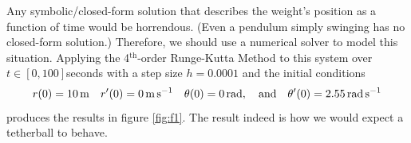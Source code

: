\documentclass{article}
\newcommand{\0}{\vb{0}}
\begin{document}
Any symbolic/closed-form solution that describes the weight's position as a function of time would be horrendous. (Even a pendulum simply swinging has no closed-form solution.) Therefore, we should use a numerical solver to model this situation. Applying the 4$^\mathrm{th}$-order Runge-Kutta Method to this system over $t \in [0, 100]$seconds with a step size $h = 0.0001$ and the initial conditions 
\[r(0) = \SI{10}{\meter} \quad r'(0) = \SI{0}{\meter\per\second} \quad \theta(0) = \SI{0}{\radian}, \qq{and} \theta'(0) = \SI{2.55}{\radian\per\second}\]
produces the results in figure \ref{fig:f1}. The result indeed is how we would expect a tetherball to behave.

\nocite{burdenc2011}
\nocite{greenbaum2012}
\nocite{press2007}
\nocite{suli2010}


\end{document}
